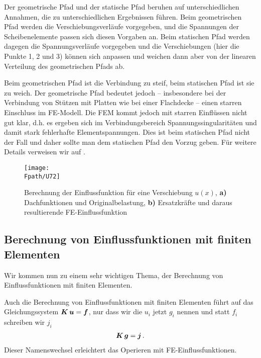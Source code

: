 \begin{remark}
Der geometrische Pfad und der statische Pfad beruhen auf unterschiedlichen Annahmen, die zu unterschiedlichen Ergebnissen f\"{u}hren. Beim geometrischen Pfad werden die Verschiebungsverl\"{a}ufe vorgegeben, und die Spannungen der Scheibenelemente passen sich diesen Vorgaben an. Beim statischen Pfad werden dagegen die Spannungsverl\"{a}ufe vorgegeben und die Verschiebungen (hier die Punkte 1, 2 und 3) k\"{o}nnen sich anpassen und weichen dann aber von der linearen Verteilung des geometrischen Pfads ab.

Beim geometrischen Pfad ist die Verbindung zu steif, beim statischen Pfad ist sie zu weich. Der geometrische Pfad bedeutet jedoch -- insbesondere bei der Verbindung von St\"{u}tzen mit Platten wie bei einer Flachdecke -- einen starren Einschluss im FE-Modell. Die FEM kommt jedoch mit starren Einfl\"{u}ssen nicht gut klar, d.h. es ergeben sich im Verbindungsbereich Spannungssingularit\"{a}ten und damit stark fehlerhafte Elementspannungen. Dies ist beim statischen Pfad nicht der Fall und daher sollte man dem statischen Pfad den Vorzug geben. F\"{u}r weitere Details verweisen wir auf  \cite{Werkle2}.
\end{remark}

\begin{figure}[tbp]
\centering
\if {} \sidecaption[t] \fi
\texttt{[image: \\Fpath/U72]}
\caption{Berechnung der Einflussfunktion f\"{u}r eine Verschiebung $u(x)$, \textbf{a)} Dachfunktionen und Originalbelastung, \textbf{ b)} Ersatzkr\"{a}fte und daraus resultierende FE-Einflussfunktion} \label{U72}
\end{figure}%



{\textcolor{sectionTitleBlue}{\section{Berechnung von Einflussfunktionen mit finiten Elementen}}}\label{InfFEM}
Wir kommen nun zu einem sehr wichtigen Thema, der Berechnung von Einflussfunktionen mit finiten Elementen.

Auch die Berechnung von Einflussfunktionen mit finiten Elementen f\"{u}hrt auf das Gleichungssystem $\mbox{\boldmath $K$}\,\mbox{\boldmath $u$} = \mbox{\boldmath $f$}$, nur dass wir die $u_i$ jetzt $g_i$ nennen und statt $f_i$ schreiben wir $j_i$
\begin{align}
\mbox{\boldmath $K$}\,\mbox{\boldmath $g$} = \mbox{\boldmath $j$}\,.
\end{align}
Dieser Namenswechsel erleichtert das Operieren mit FE-Einflussfunktionen.

